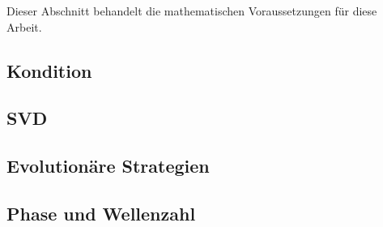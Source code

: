 Dieser Abschnitt behandelt die mathematischen Voraussetzungen für diese Arbeit.
%
\subsection{Kondition}

%
\subsection{SVD}

%
\subsection{Evolutionäre Strategien}

%
\subsection{Phase und Wellenzahl}


%